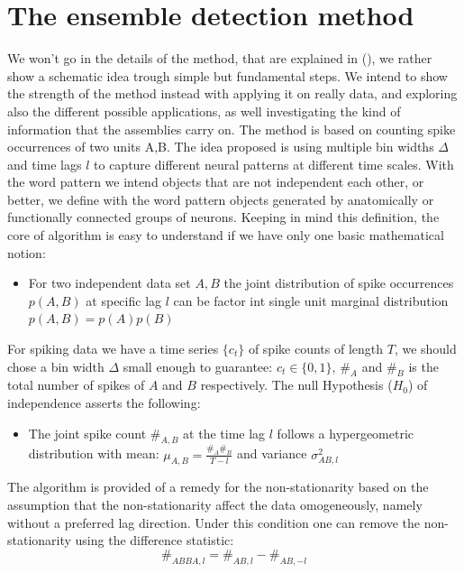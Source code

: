\documentclass{article}
\begin{document}
\section{The ensemble detection method}
We won't go in the details of the method, that are explained in (\cite{RussoDurstewitz}), we rather show a schematic idea trough simple but fundamental steps. We intend to show the strength of the method instead with applying it on really data, and exploring also the different possible applications, as well investigating the kind of information that the assemblies carry on.
The method is based on counting spike occurrences of two units A,B. The idea proposed is using  multiple bin widths $\Delta$ and time lags $l$ to capture different neural patterns at different time scales. With the word pattern we intend objects that are not independent each other, or better, we define with the word pattern objects generated by anatomically or functionally connected groups of neurons. Keeping in mind this definition, the core of algorithm is easy to understand if we have only one basic mathematical notion:
\begin{itemize}
    \item For two independent data set $A, B$ the joint distribution of spike occurrences $p(A,B)$ at specific lag $l$ can be factor int single unit marginal distribution $p(A,B)=p(A)p(B)$
\end{itemize}
For spiking data we have a time series $\{c_t\}$ of spike counts of length $T$, we should chose a bin width $\Delta$ small enough to guarantee: $c_t \in \{0,1\}$, $\#_A$ and $\#_B$ is the total number of spikes of $A$ and $B$ respectively. The null Hypothesis ($H_0$) of independence asserts the following:
\begin{itemize}
    \item The joint spike count $\#_{A,B}$ at the time lag $l$ follows a hypergeometric distribution with mean: $\mu_{A,B} = \frac{\#_A \#_B}{T-l}$ and variance $\sigma^2_{AB,l}$
\end{itemize}
The algorithm is provided of a remedy for the non-stationarity based on the assumption that the non-stationarity affect the data omogeneously, namely without a preferred lag direction. Under this condition one can remove the non-stationarity using the difference statistic:
$$\#_{ABBA,l}=\#_{AB,l}-\#_{AB,-l}$$
\end{document}
